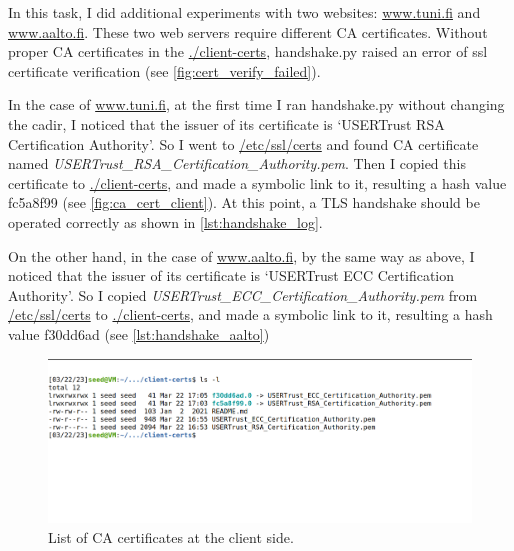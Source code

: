 In this task, I did additional experiments with two websites: \url{www.tuni.fi} and \url{www.aalto.fi}.
These two web servers require different CA certificates. Without proper CA certificates
in the \url{./client-certs}, {\selectfont handshake.py} raised an error
of ssl certificate verification (see \autoref{fig:cert_verify_failed}).

In the case of \url{www.tuni.fi}, at the first time I ran {\selectfont
handshake.py} without changing the {\selectfont cadir}, I noticed that
the issuer of its certificate is `USERTrust RSA Certification Authority'. So I went to
\url{/etc/ssl/certs} and found CA certificate named
\emph{USERTrust\_RSA\_Certification\_Authority.pem}. Then I copied this certificate to
\url{./client-certs}, and made a symbolic link to it, resulting a hash value
{\selectfont fc5a8f99} (see \autoref{fig:ca_cert_client}). At this point,
a TLS handshake should be operated correctly as shown in \autoref{lst:handshake_log}.

On the other hand, in the case of \url{www.aalto.fi}, by the same way as above, I noticed
that the issuer of its certificate is `USERTrust ECC Certification Authority'. So I copied
\emph{USERTrust\_ECC\_Certification\_Authority.pem} from \url{/etc/ssl/certs} to
\url{./client-certs}, and made a symbolic link to it, resulting a hash value
{\selectfont f30dd6ad} (see \autoref{lst:handshake_aalto})

\begin{figure}[h]
    \centering
    \includegraphics[width=\textwidth,height=\textheight,keepaspectratio]
    {figures/list_of_client_cert.png}
    \caption{List of CA certificates at the client side.}
    \label{fig:ca_cert_client}
\end{figure}


